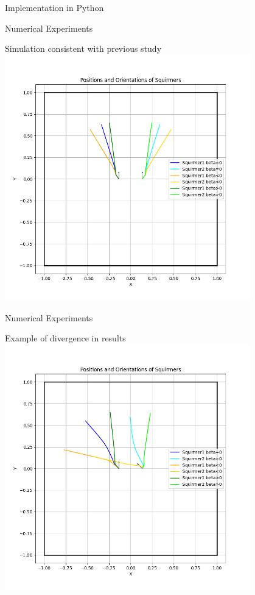 \documentclass{beamer}
\begin{document}
\begin{frame}{Implementation in Python}
\begin{frame}{Numerical Experiments}
    \begin{center}
        Simulation consistent with previous study \cite{Stark}
        \includegraphics[width=0.8\textwidth]{../../graphs/simulations/twosquirmerinter/sq2.pi.2.png}
    \end{center}
\end{frame}

\begin{frame}{Numerical Experiments}
    \begin{center}
        Example of divergence in results
        \includegraphics[width=0.8\textwidth]{../../graphs/simulations/twosquirmerinter/sq2.3pi.4.png}
    \end{center}
\end{frame}


\end{frame}
\end{document}
